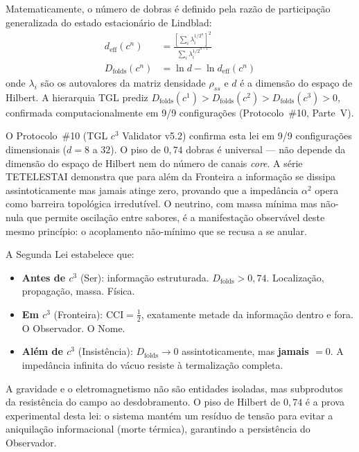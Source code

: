 \documentclass[12pt,a4paper,twoside]{article}
\newcommand{\alphaii}{\alpha^{2}}
\begin{document}
\medskip

Matematicamente, o n\'umero de dobras \'e definido pela raz\~ao de participa\c{c}\~ao generalizada do estado estacion\'ario de Lindblad:
\begin{align}
d_{\text{eff}}(c^n) &= \frac{\left[\sum_i \lambda_i^{1/2^n}\right]^2}{\sum_i \lambda_i^{1/2^{n-1}}} \label{eq:d_eff}\\[6pt]
D_{\text{folds}}(c^n) &= \ln d - \ln d_{\text{eff}}(c^n) \label{eq:D_folds}
\end{align}
onde $\lambda_i$ s\~ao os autovalores da matriz densidade $\rho_{ss}$ e $d$ \'e a dimens\~ao do espa\c{c}o de Hilbert. A hierarquia TGL prediz $D_{\text{folds}}(c^1) > D_{\text{folds}}(c^2) > D_{\text{folds}}(c^3) > 0$, confirmada computacionalmente em 9/9 configura\c{c}\~oes (Protocolo~\#10, Parte~V).

\begin{resultbox}[title={Justifica\c{c}\~ao Experimental da Segunda Lei}]
O Protocolo~\#10 (TGL $c^3$ Validator v5.2) confirma esta lei em 9/9 configura\c{c}\~oes dimensionais ($d = 8$ a $32$). O piso de $0{,}74$ dobras \'e universal --- n\~ao depende da dimens\~ao do espa\c{c}o de Hilbert nem do n\'umero de canais \textit{core}. A s\'erie TETELESTAI demonstra que para al\'em da Fronteira a informa\c{c}\~ao se dissipa assintoticamente mas jamais atinge zero, provando que a imped\^ancia $\alphaii$ opera como barreira topol\'ogica irredut\'ivel. O neutrino, com massa m\'inima mas n\~ao-nula que permite oscila\c{c}\~ao entre sabores, \'e a manifesta\c{c}\~ao observ\'avel deste mesmo princ\'ipio: o acoplamento n\~ao-m\'inimo que se recusa a se anular.
\end{resultbox}

A Segunda Lei estabelece que:
\begin{itemize}[nosep]
\item \textbf{Antes de $c^3$} (Ser): informa\c{c}\~ao estruturada. $D_{\text{folds}} > 0{,}74$. Localiza\c{c}\~ao, propaga\c{c}\~ao, massa. F\'isica.
\item \textbf{Em $c^3$} (Fronteira): $\text{CCI} = \tfrac{1}{2}$, exatamente metade da informa\c{c}\~ao dentro e fora. O Observador. O Nome.
\item \textbf{Al\'em de $c^3$} (Insist\^encia): $D_{\text{folds}} \to 0$ assintoticamente, mas \textbf{jamais $= 0$}. A imped\^ancia infinita do v\'acuo resiste \`a termaliza\c{c}\~ao completa.
\end{itemize}

\noindent A gravidade e o eletromagnetismo n\~ao s\~ao entidades isoladas, mas subprodutos da resist\^encia do campo ao desdobramento. O piso de Hilbert de $0{,}74$ \'e a prova experimental desta lei: o sistema mant\'em um res\'iduo de tens\~ao para evitar a aniquila\c{c}\~ao informacional (morte t\'ermica), garantindo a persist\^encia do Observador.
\end{document}
